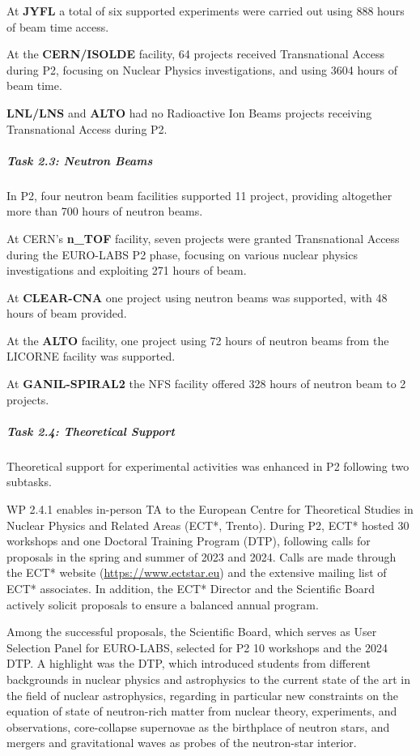 At \textbf{JYFL} a total of six supported experiments were carried out using 888 hours of beam time access. %

At the \textbf{CERN/ISOLDE} facility, 64 projects received Transnational Access during P2, focusing on Nuclear Physics investigations, and using 3604 hours of beam time.

\textbf{LNL/LNS} and \textbf{ALTO} had no Radioactive Ion Beams projects receiving Transnational Access during P2.

\subparagraph{Task 2.3: Neutron Beams} \mbox{}


In P2, four neutron beam facilities supported 11 project, providing altogether more than 700 hours of neutron beams.

At CERN's \textbf{n\_TOF} facility, seven projects were granted Transnational Access during the EURO-LABS P2 phase, focusing on various nuclear physics investigations and exploiting 271 hours of beam.

At \textbf{CLEAR-CNA} one project using neutron beams was supported, with 48 hours of beam provided.

At the \textbf{ALTO} facility, one project using 72 hours of neutron beams from the LICORNE facility was supported.

At \textbf{GANIL-SPIRAL2} the NFS facility offered 328 hours of neutron beam to 2 projects.

\subparagraph{Task 2.4: Theoretical Support} \mbox{}


Theoretical support for experimental activities was enhanced in P2 following two subtasks. 

WP 2.4.1 enables in-person TA to the European Centre for Theoretical Studies in Nuclear Physics and Related Areas (ECT*, Trento). During P2, ECT* hosted 30 workshops and one Doctoral Training Program (DTP), following calls for proposals in the spring and summer of  2023 and 2024. Calls are made through the ECT* website (\url{https://www.ectstar.eu}) and the extensive mailing list of ECT* associates. In addition, the ECT* Director and the Scientific Board actively solicit proposals to ensure a balanced annual program.

Among the successful proposals, the Scientific Board, which serves as User Selection Panel for EURO-LABS, selected for P2 10 workshops and the 2024 DTP.  A highlight was the DTP, which introduced students from different backgrounds in nuclear physics and astrophysics to the current state of the art in the field of nuclear astrophysics, regarding in particular new constraints on the equation of state of neutron-rich matter from nuclear theory, experiments, and observations, core-collapse supernovae as the birthplace of neutron stars, and mergers and gravitational waves as probes of the neutron-star interior. 

